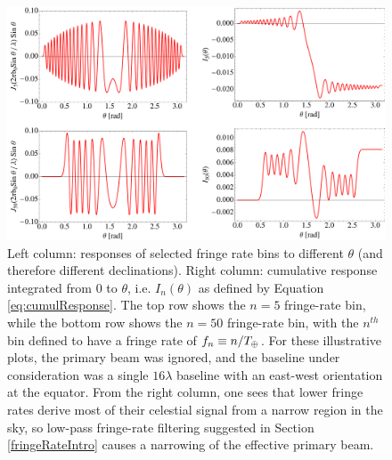 \documentclass[twocolumn,numberedappendix]{emulateapj}
\newcommand{\rhat}{\hat{\mathbf{r}}}
\begin{document}
\begin{figure}
\centering
\includegraphics[width=1.0\textwidth]{besselContributions.pdf}
\caption{Left column: responses of selected fringe rate bins to different $\theta$ (and therefore different declinations).  Right column: cumulative response integrated from $0$ to $\theta$, i.e. $I_n (\theta)$ as defined by Equation \eqref{eq:cumulResponse}.  The top row shows the $n=5$ fringe-rate bin, while the bottom row shows the $n=50$ fringe-rate bin, with the $n^{th}$ bin defined to have a fringe rate of $f_n \equiv n / T_\oplus$.  For these illustrative plots, the primary beam was ignored, and the baseline under consideration was a single $16\lambda$ baseline with an east-west orientation at the equator.  From the right column, one sees that lower fringe rates derive most of their celestial signal from a narrow region in the sky, so low-pass fringe-rate filtering suggested in Section \ref{fringeRateIntro} causes a narrowing of the effective primary beam.}
\label{besselContributions}
\end{figure}
\end{document}
